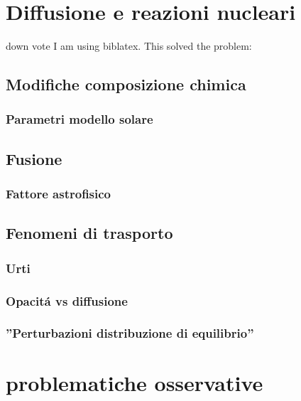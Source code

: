 \documentclass[../main.tex]{subfiles}
\begin{document}
\chapter{Diffusione e reazioni nucleari}

\begin{refsection}

\nocite{*}

down vote
I am using biblatex. This solved the problem:

\begingroup
\let\clearpage\relax
\printbibliography
\endgroup


\section{Modifiche composizione chimica}

\subsection{Parametri modello solare}

\section{Fusione}

\subsection{Fattore astrofisico}

\section{Fenomeni di trasporto}

\subsection{Urti}

\subsection{Opacit\'a vs diffusione}

\subsection{''Perturbazioni distribuzione di equilibrio''}


\end{refsection}


\chapter{problematiche osservative}
\end{document}
